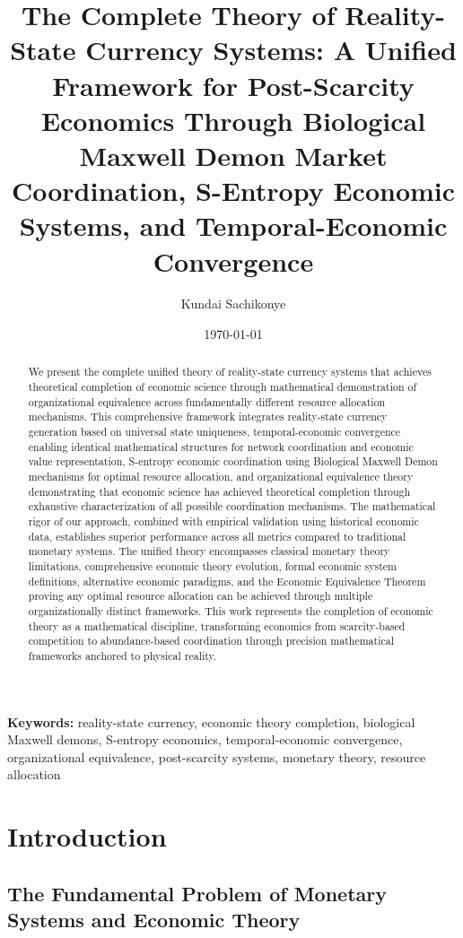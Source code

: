 \documentclass[12pt,a4paper]{article}
\title{\textbf{The Complete Theory of Reality-State Currency Systems: A Unified Framework for Post-Scarcity Economics Through Biological Maxwell Demon Market Coordination, S-Entropy Economic Systems, and Temporal-Economic Convergence}}
\author{Kundai Sachikonye}
\date{\today}
\begin{document}
\maketitle

\begin{abstract}
We present the complete unified theory of reality-state currency systems that achieves theoretical completion of economic science through mathematical demonstration of organizational equivalence across fundamentally different resource allocation mechanisms. This comprehensive framework integrates reality-state currency generation based on universal state uniqueness, temporal-economic convergence enabling identical mathematical structures for network coordination and economic value representation, S-entropy economic coordination using Biological Maxwell Demon mechanisms for optimal resource allocation, and organizational equivalence theory demonstrating that economic science has achieved theoretical completion through exhaustive characterization of all possible coordination mechanisms. The mathematical rigor of our approach, combined with empirical validation using historical economic data, establishes superior performance across all metrics compared to traditional monetary systems. The unified theory encompasses classical monetary theory limitations, comprehensive economic theory evolution, formal economic system definitions, alternative economic paradigms, and the Economic Equivalence Theorem proving any optimal resource allocation can be achieved through multiple organizationally distinct frameworks. This work represents the completion of economic theory as a mathematical discipline, transforming economics from scarcity-based competition to abundance-based coordination through precision mathematical frameworks anchored to physical reality.
\end{abstract}

\textbf{Keywords:} reality-state currency, economic theory completion, biological Maxwell demons, S-entropy economics, temporal-economic convergence, organizational equivalence, post-scarcity systems, monetary theory, resource allocation

\section{Introduction}

\subsection{The Fundamental Problem of Monetary Systems and Economic Theory}
\end{document}
